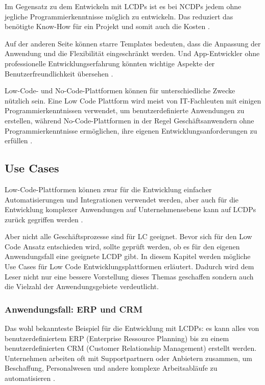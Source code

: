 \documentclass[12pt]{article} %
\begin{document}
	Im Gegensatz zu dem Entwickeln mit LCDPs ist es bei NCDPs jedem ohne jegliche Programmierkenntnisse möglich zu entwickeln. Das reduziert das benötigte Know-How für ein Projekt und somit auch die Kosten \autocite{Microsoft.2023}. \newline
	
	Auf der anderen Seite können starre Templates bedeuten, dass die Anpassung der Anwendung und die Flexibilität eingeschränkt werden.
	Und App-Entwickler ohne professionelle Entwicklungserfahrung könnten wichtige Aspekte der Benutzerfreundlichkeit übersehen \autocite{Microsoft.2023}. \newline	
	
	Low-Code- und No-Code-Plattformen können für unterschiedliche Zwecke nützlich sein. Eine Low Code Plattform wird meist von IT-Fachleuten mit einigen Programmierkenntnissen verwendet, um benutzerdefinierte Anwendungen zu erstellen, während No-Code-Plattformen in der Regel Geschäftsanwendern ohne Programmierkenntnisse ermöglichen, ihre eigenen Entwicklungsanforderungen zu erfüllen \autocite{Microsoft.2023}. 

	\subsection{Use Cases}	
	Low-Code-Plattformen können zwar für die Entwicklung einfacher Automatisierungen und Integrationen verwendet werden, aber auch für die Entwicklung komplexer Anwendungen auf Unternehmensebene kann auf LCDPs zurück gegriffen werden \autocite{KevinShuler.2023}. \newline
	
	Aber nicht alle Geschäftsprozesse sind für LC geeignet. Bevor sich für den Low Code Ansatz entschieden wird, sollte geprüft werden, ob es für den eigenen Anwendungsfall eine geeignete LCDP gibt. In diesem Kapitel werden mögliche Use Cases für Low Code Entwicklungsplattformen erläutert. Dadurch wird dem Leser nicht nur eine bessere Vorstellung dieses Themas geschaffen sondern auch die Vielzahl der Anwendungsgebiete verdeutlicht.

	\subsubsection{Anwendungsfall: ERP und CRM}
	Das wohl bekannteste Beispiel für die Entwicklung mit LCDPs: es kann alles von benutzerdefiniertem ERP (Enterprise Ressource Planning) bis zu einem benutzerdefinierten CRM (Customer Relationship Management) erstellt werden. Unternehmen arbeiten oft mit Supportpartnern oder Anbietern zusammen, um Beschaffung, Personalwesen und andere komplexe Arbeitsabläufe zu automatisieren \autocite{KevinShuler.2023}.
	
\end{document}
